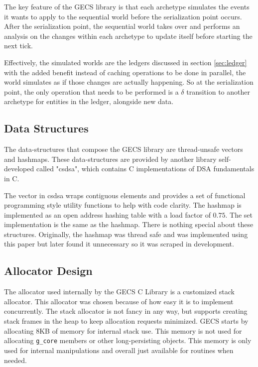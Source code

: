 The key feature of the GECS library is that each archetype simulates the events it wants to apply to the sequential world before the serialization point occurs. After the serialization point, the sequential world takes over and performs an analysis on the changes within each archetype to update itself before starting the next tick.

Effectively, the simulated worlds are the ledgers discussed in section \ref{sec:ledger} with the added benefit instead of caching operations to be done in parallel, the world simulates as if those changes are actually happening. So at the serialization point, the only operation that needs to be performed is a $\delta$ transition to another archetype for entities in the ledger, alongside new data.

\subsection{Data Structures}
\label{sec:ds}
The data-structures that compose the GECS library are thread-unsafe vectors and hashmaps. These data-structures are provided by another library self-developed called "csdsa", which contains C implementations of DSA fundamentals in C. 

The vector in csdsa wraps contiguous elements and provides a set of functional programming style utility functions to help with code clarity. The hashmap is implemented as an open address hashing table with a load factor of $0.75$. The set implementation is the same as the hashmap. There is nothing special about these structures. Originally, the hashmap was thread safe and was implemented using this paper \cite{hashmaps} but later found it unnecessary so it was scraped in development. 

\subsection{Allocator Design}
The allocator used internally by the GECS C Library is a customized stack allocator. This allocator was chosen because of how easy it is to implement concurrently. The stack allocator is not fancy in any way, but supports creating stack frames in the heap to keep allocation requests minimized. GECS starts by allocating 8KB of memory for internal stack use. This memory is not used for allocating \texttt{g\_core} members or other long-persisting objects. This memory is only used for internal manipulations and overall just available for routines when needed.

